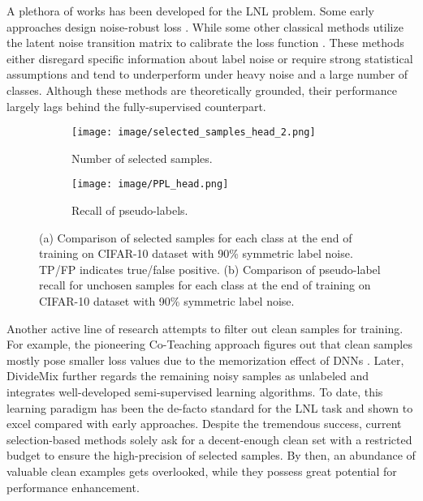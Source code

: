 \documentclass{article}
\begin{document}
A plethora of works has been developed for the LNL problem. Some early approaches 
design noise-robust loss \cite{DBLP:conf/iccv/0001MCLY019,https://doi.org/10.48550/arxiv.2212.04055}. While some other classical methods utilize the latent noise transition matrix to calibrate the loss function \cite{DBLP:conf/cvpr/PatriniRMNQ17,DBLP:conf/nips/XiaLW00NS19,DBLP:journals/corr/abs-2202-01273}. These methods either disregard specific information about label noise or require strong statistical assumptions and tend to underperform under heavy noise and a large number of classes. Although these methods are theoretically grounded, their performance largely lags behind the fully-supervised counterpart.

\begin{figure}[t]
     \centering
     \begin{subfigure}{0.49\linewidth}
         \texttt{[image: image/selected\_samples\_head\_2.png]}
         \caption{Number of selected samples.}
         \label{fig:headfigure_1}
     \end{subfigure}
     \hfill
     \begin{subfigure}{0.49\linewidth}
         \texttt{[image: image/PPL\_head.png]}
         \caption{Recall of pseudo-labels.}
         \label{fig:headfigure_2}
     \end{subfigure}
     \caption{ (a) Comparison of selected samples for each class at the end of training on CIFAR-10 dataset with 90\% symmetric label noise. TP/FP 
 indicates true/false positive. (b) Comparison of pseudo-label recall for unchosen samples for each class at the end of training on CIFAR-10 dataset with 90\% symmetric label noise. }
 \vskip -0.1in
     \label{fig:headfigure}
\end{figure}

Another active line of research \cite{DBLP:conf/cvpr/WeiFC020,DBLP:conf/iclr/LiSH20,DBLP:conf/cvpr/YaoSZS00T21} attempts to filter out clean samples for training. For example, the pioneering Co-Teaching approach \cite{DBLP:conf/nips/HanYYNXHTS18} figures out that clean samples mostly pose smaller loss values due to the memorization effect of DNNs \cite{DBLP:conf/iclr/ZhangBHRV17}. Later, DivideMix \cite{DBLP:conf/iclr/LiSH20} further regards the remaining noisy samples as unlabeled and integrates well-developed semi-supervised learning algorithms. To date, this learning paradigm has been the de-facto standard for the LNL task \cite{DBLP:conf/cvpr/YaoSZS00T21,DBLP:conf/cvpr/KarimRRMS22,DBLP:journals/pr/CordeiroSBRC23} and shown to excel compared with early approaches. Despite the tremendous success, current selection-based methods solely ask for a decent-enough clean set with a restricted budget to ensure the high-precision of selected samples. 
By then, an abundance of valuable clean examples gets overlooked, while they possess great potential for performance enhancement.
\end{document}
